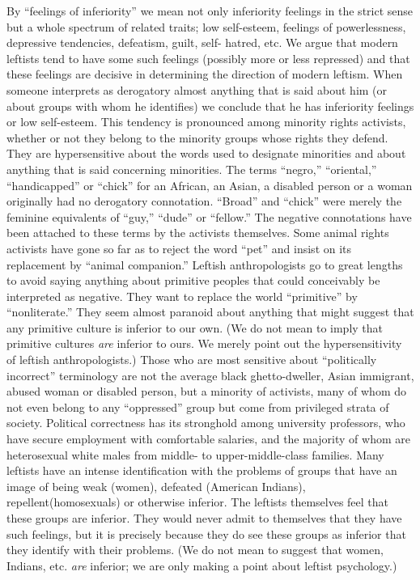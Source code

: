  By “feelings of inferiority” we mean not only inferiority feelings in the strict sense but a whole spectrum of related traits; low self-esteem, feelings of powerlessness, depressive tendencies, defeatism, guilt, self- hatred, etc. We argue that modern leftists tend to have some such feelings (possibly more or less repressed) and that these feelings are decisive in determining the direction of modern leftism.
 When someone interprets as derogatory almost anything that is said about him (or about groups with whom he identifies) we conclude that he has inferiority feelings or low self-esteem. This tendency is pronounced among minority rights activists, whether or not they belong to the minority groups whose rights they defend. They are hypersensitive about the words used to designate minorities and about anything that is said concerning minorities. The terms “negro,” “oriental,” “handicapped” or “chick” for an African, an Asian, a disabled person or a woman originally had no derogatory connotation. “Broad” and “chick” were merely the feminine equivalents of “guy,” “dude” or “fellow.” The negative connotations have been attached to these terms by the activists themselves. Some animal rights activists have gone so far as to reject the word “pet” and insist on its replacement by “animal companion.” Leftish anthropologists go to great lengths to avoid saying anything about primitive peoples that could conceivably be interpreted as negative. They want to replace the world “primitive” by “nonliterate.” They seem almost paranoid about anything that might suggest that any primitive culture is inferior to our own. (We do not mean to imply that primitive cultures {\em are} inferior to ours. We merely point out the hypersensitivity of leftish anthropologists.)
 Those who are most sensitive about “politically incorrect” terminology are not the average black ghetto-dweller, Asian immigrant, abused woman or disabled person, but a minority of activists, many of whom do not even belong to any “oppressed” group but come from privileged strata of society. Political correctness has its stronghold among university professors, who have secure employment with comfortable salaries, and the majority of whom are heterosexual white males from middle- to upper-middle-class families.
 Many leftists have an intense identification with the problems of groups that have an image of being weak (women), defeated (American Indians), repellent\break (homosexuals) or otherwise inferior. The leftists themselves feel that these groups are inferior. They would never admit to themselves that they have such feelings, but it is precisely because they do see these groups as inferior that they identify with their problems. (We do not mean to suggest that women, Indians, etc. {\em are} inferior; we are only making a point about leftist psychology.)
